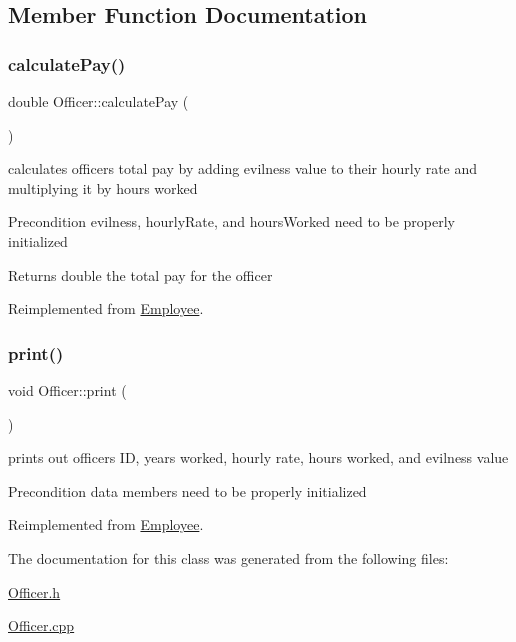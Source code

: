 \subsection{Member Function Documentation}
\mbox{\label{classOfficer_a1fa1aad39b9e95be7a088990ebf17059}} 
\subsubsection{\texorpdfstring{calculate\+Pay()}{calculatePay()}}
{\footnotesize\ttfamily double Officer\+::calculate\+Pay (\begin{DoxyParamCaption}{ }\end{DoxyParamCaption})\hspace{0.3cm}{\ttfamily [virtual]}}

calculates officer\textquotesingle{}s total pay by adding evilness value to their hourly rate and multiplying it by hours worked

\begin{DoxyPrecond}{Precondition}
evilness, hourly\+Rate, and hours\+Worked need to be properly initialized 
\end{DoxyPrecond}
\begin{DoxyReturn}{Returns}
double the total pay for the officer 
\end{DoxyReturn}


Reimplemented from \hyperlink{classEmployee_a01c2c44e15434237db28832f6972e960}{Employee}.

\mbox{\label{classOfficer_aeadece05a1a0b7fb29bd412830d2e07a}} 
\subsubsection{\texorpdfstring{print()}{print()}}
{\footnotesize\ttfamily void Officer\+::print (\begin{DoxyParamCaption}{ }\end{DoxyParamCaption})\hspace{0.3cm}{\ttfamily [virtual]}}

prints out officer\textquotesingle{}s ID, years worked, hourly rate, hours worked, and evilness value

\begin{DoxyPrecond}{Precondition}
data members need to be properly initialized 
\end{DoxyPrecond}


Reimplemented from \hyperlink{classEmployee_a79556ad700627dba88049f487a34a762}{Employee}.



The documentation for this class was generated from the following files\+:\begin{DoxyCompactItemize}
\item 
\hyperlink{Officer_8h}{Officer.\+h}\item 
\hyperlink{Officer_8cpp}{Officer.\+cpp}\end{DoxyCompactItemize}
